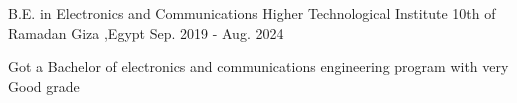 

\begin{cventries}
  \cventry
    {\normalsize B.E. in Electronics and Communications} %
    {\large Higher Technological Institute 10th of Ramadan } %
    {\normalsize Giza ,\normalsize Egypt} %
    {\normalsize Sep. 2019 - \normalsize Aug. 2024} %
    {
      \begin{cvitems} %
        \item {\normalsize Got a Bachelor of electronics and communications engineering program with very Good grade}
      \end{cvitems}
    }

\end{cventries}
